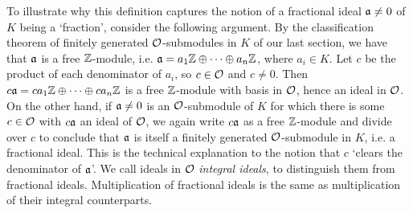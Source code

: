 To illustrate why this definition captures the notion of a fractional ideal $\mathfrak{a}\neq 0$ of $K$ being a `fraction', consider the following argument. By the classification theorem of finitely generated $\mathcal{O}$-submodules in $K$ of our last section, we have that $\mathfrak{a}$ is a free $\mathbb{Z}$-module, i.e. $\mathfrak{a}=a_1\mathbb{Z}\oplus\cdots\oplus a_n\mathbb{Z}$, where $a_i\in K$. Let $c$ be the product of each denominator of $a_i$, so $c\in\mathcal{O}$ and $c\neq 0$. Then $c\mathfrak{a} = ca_1\mathbb{Z}\oplus\cdots\oplus ca_n\mathbb{Z}$ is a free $\mathbb{Z}$-module with basis in $\mathcal{O}$, hence an ideal in $\mathcal{O}$. On the other hand, if $\mathfrak{a}\neq 0$ is an $\mathcal{O}$-submodule of $K$ for which there is some $c\in\mathcal{O}$ with $c\mathfrak{a}$ an ideal of $\mathcal{O}$, we again write $c\mathfrak{a}$ as a free $\mathbb{Z}$-module and divide over $c$ to conclude that $\mathfrak{a}$ is itself a finitely generated $\mathcal{O}$-submodule in $K$, i.e. a fractional ideal. This is the technical explanation to the notion that $c$ `clears the denominator of $\mathfrak{a}$'. We call ideals in $\mathcal{O}$ \emph{integral ideals}, to distinguish them from fractional ideals. Multiplication of fractional ideals is the same as multiplication of their integral counterparts.


